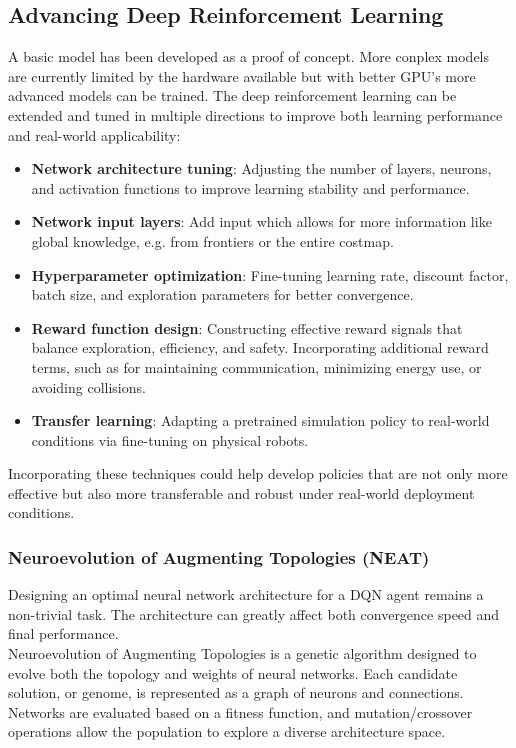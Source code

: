 \subsection{Advancing Deep Reinforcement Learning}
A basic model has been developed as a proof of concept. More conplex models are currently limited by the hardware available but with better GPU's more advanced models can be trained.
The deep reinforcement learning can be extended and tuned in multiple directions to improve both learning performance and real-world applicability:

\begin{itemize}
  \item \textbf{Network architecture tuning}: Adjusting the number of layers, neurons, and activation functions to improve learning stability and performance.
  \item \textbf{Network input layers}: Add input which allows for more information like global knowledge, e.g. from frontiers or the entire costmap.
  \item \textbf{Hyperparameter optimization}: Fine-tuning learning rate, discount factor, batch size, and exploration parameters for better convergence.
  \item \textbf{Reward function design}: Constructing effective reward signals that balance exploration, efficiency, and safety. Incorporating additional reward terms, such as for maintaining communication, minimizing energy use, or avoiding collisions.
  \item \textbf{Transfer learning}: Adapting a pretrained simulation policy to real-world conditions via fine-tuning on physical robots.
\end{itemize}

Incorporating these techniques could help develop policies that are not only more effective but also more transferable and robust under real-world deployment conditions.

\subsubsection{Neuroevolution of Augmenting Topologies (NEAT)}
Designing an optimal neural network architecture for a DQN agent remains a non-trivial task. The architecture can greatly affect both convergence speed and final performance.\\

Neuroevolution of Augmenting Topologies \cite{neat} is a genetic algorithm designed to evolve both the topology and weights of neural networks. Each candidate solution, or genome, is represented as a graph of neurons and connections. Networks are evaluated based on a fitness function, and mutation/crossover operations allow the population to explore a diverse architecture space.\\

